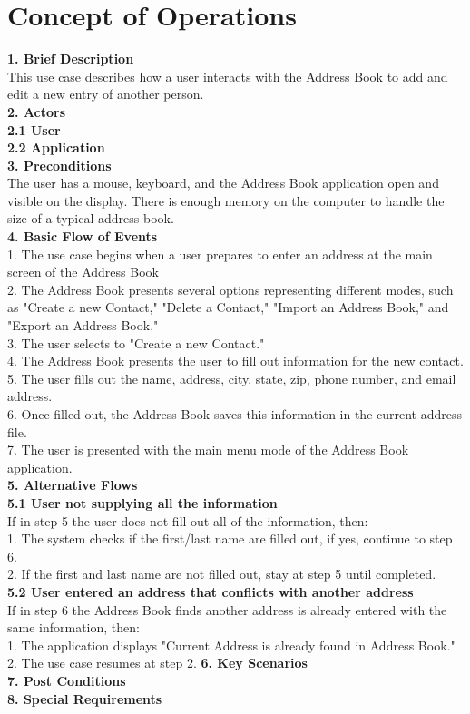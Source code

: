 \documentclass[a4paper, 11pt]{article}
\newcommand\tab[1][1cm]{\hspace*{#1}}
\begin{document}
\section{Concept of Operations}
\large \textbf{1. Brief Description}\\
This use case describes how a user interacts with the Address Book to add and edit a new entry of another person. \\
\large \textbf{2. Actors}\\
\tab \large  \textbf{2.1 User}\\
\tab \large  \textbf{2.2 Application}\\
\large \textbf{3. Preconditions}\\
The user has a mouse, keyboard, and the Address Book application open and visible on the display. There is enough memory on the computer to handle the size of a typical address book.\\
\large \textbf{4. Basic Flow of Events}\\
1. The use case begins when a user prepares to enter an address at the main screen of the Address Book\\
2. The Address Book presents several options representing different modes, such as "Create a new Contact," "Delete a Contact," "Import an Address Book," and "Export an Address Book."\\ 
3. The user selects to "Create a new Contact." \\
4. The Address Book presents the user to fill out information for the new contact.\\
5. The user fills out the name, address, city, state, zip, phone number, and email address. \\
6. Once filled out, the Address Book saves this information in the current address file.\\
7. The user is presented with the main menu mode of the Address Book application.\\
\large \textbf{5. Alternative Flows}\\
\textbf{5.1 User not supplying all the information} \\
If in step 5 the user does not fill out all of the information, then:\\
\tab 1. The system checks if the first/last name are filled out, if yes, continue to step 6.\\
\tab 2. If the first and last name are not filled out, stay at step 5 until completed.\\
\textbf{5.2 User entered an address that conflicts with another address} \\
If in step 6 the Address Book finds another address is already entered with the same information, then:\\
\tab 1. The application displays "Current Address is already found in Address Book."\\
\tab 2. The use case resumes at step 2.
\large \textbf{6. Key Scenarios}\\
\large \textbf{7. Post Conditions}\\
\large \textbf{8. Special Requirements}\\
\end{document}
